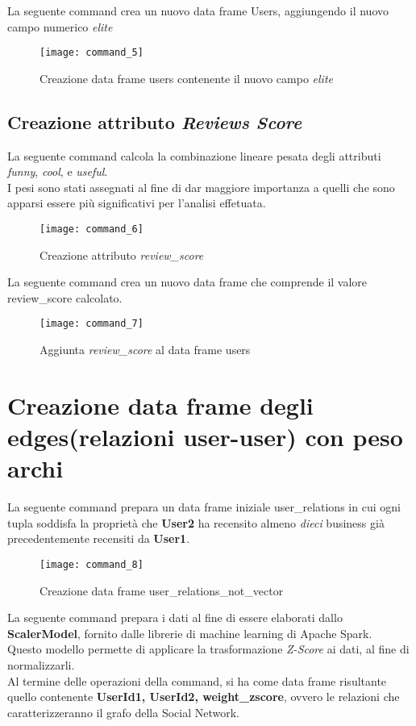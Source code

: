 La seguente command crea un nuovo data frame Users, aggiungendo il nuovo campo
numerico \textit{elite}
\begin{figure}[!htbp]
	\texttt{[image: command\_5]}
	\caption{Creazione data frame users contenente il nuovo campo \textit{elite}}
	\label{command_5}
\end{figure}

\subsection{Creazione attributo \textit{Reviews Score}}
La seguente command calcola la combinazione lineare pesata degli attributi \textit{funny},
\textit{cool}, e \textit{useful}.\\
I pesi sono stati assegnati al fine di dar maggiore importanza a quelli che
sono apparsi essere più significativi per l'analisi effetuata.
\begin{figure}[!htbp]
	\texttt{[image: command\_6]}
	\caption{Creazione attributo \textit{review\_score}}
	\label{command_6}
\end{figure}

La seguente command crea un nuovo data frame che comprende il valore review\_score
calcolato.
\begin{figure}[!htbp]
	\texttt{[image: command\_7]}
	\caption{Aggiunta \textit{review\_score} al data frame users}
	\label{command_7}
\end{figure}

\clearpage

\section{Creazione data frame degli edges(relazioni user-user) con peso archi}
La seguente command prepara un data frame iniziale user\_relations in cui ogni tupla
soddisfa la proprietà che \textbf{User2} ha recensito almeno \textit{dieci}
business già precedentemente recensiti da \textbf{User1}.
\begin{figure}[!htbp]
	\texttt{[image: command\_8]}
	\caption{Creazione data frame user\_relations\_not\_vector}
	\label{command_8}
\end{figure}

\clearpage

La seguente command prepara i dati al fine di essere elaborati dallo
\textbf{ScalerModel}, fornito dalle librerie di machine learning di Apache Spark.\\
Questo modello permette di applicare la trasformazione \textit{Z-Score} ai dati,
al fine di normalizzarli.\\
Al termine delle operazioni della command, si ha come data frame risultante quello
contenente \textbf{UserId1, UserId2, weight\_zscore}, ovvero le relazioni
che caratterizzeranno il grafo della Social Network.

